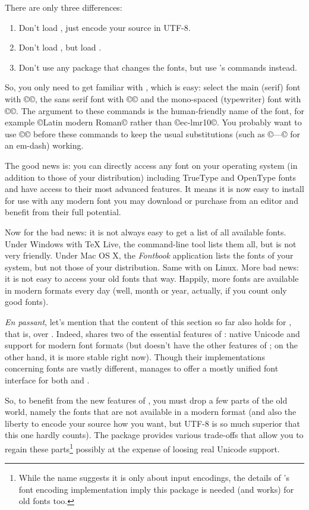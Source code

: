 \documentclass{lltxdoc}
\begin{document}
There are only three differences:
\begin{enumerate}
  \item Don't load , just encode your source in UTF-8.
  \item Don't load , but load .
  \item Don't use any package that changes the fonts, but use 's
    commands instead.
\end{enumerate}
So, you only need to get familiar with , which is
easy: select the main (serif) font with ©\setmainfont©, the sans serif font
with ©\setsansfont© and the mono-spaced (typewriter) font with ©\setmonofont©.
The argument to these commands is the human-friendly name of the font, for
example ©Latin modern Roman© rather than ©ec-lmr10©. You probably want to use
©© before these commands to keep the usual
\tex substitutions (such as ©---© for an em-dash) working.

The good news is: you can directly access any font on your operating system
(in addition to those of your \tex distribution) including TrueType and
OpenType fonts and have access to their most advanced features. It means it
is now easy to install for use with \lualatex any modern font you may download
or purchase from an editor and benefit from their full potential.

Now for the bad news: it is not always easy to get a list of all available
fonts. Under Windows with TeX Live, the command-line tool  lists
them all, but is not very friendly. Under Mac OS X, the \emph{Fontbook}
application lists the fonts of your system, but not those of your
distribution. Same with  on Linux. More bad news: it is not easy
to access your old fonts that way. Happily, more fonts are available in modern
formats every day (well, month or year, actually, if you count only good
fonts).

\emph{En passant}, let's mention that the content of this section so far also
holds for \xelatex, that is, \latex over \xetex. Indeed, \xetex shares two of
the essential features of \luatex: native Unicode and support for modern font
formats (but doesn't have the other features of \luatex; on the other hand, it
is more stable right now). Though their implementations concerning fonts are
vastly different,  manages to offer a mostly unified font
interface for both \xelatex and \lualatex.

So, to benefit from the new features of \luatex, you must drop a few parts of
the old world, namely the fonts that are not available in a modern format (and
also the liberty to encode your source how you want, but UTF-8 is so much
superior that this one hardly counts). The package  provides
various trade-offs that allow you to regain these parts\footnote{While the
  name suggests it is only about input encodings, the details of \latex's font
  encoding implementation imply this package is needed (and works) for old
  fonts too.} possibly at the expense of loosing real Unicode support.
\end{document}
